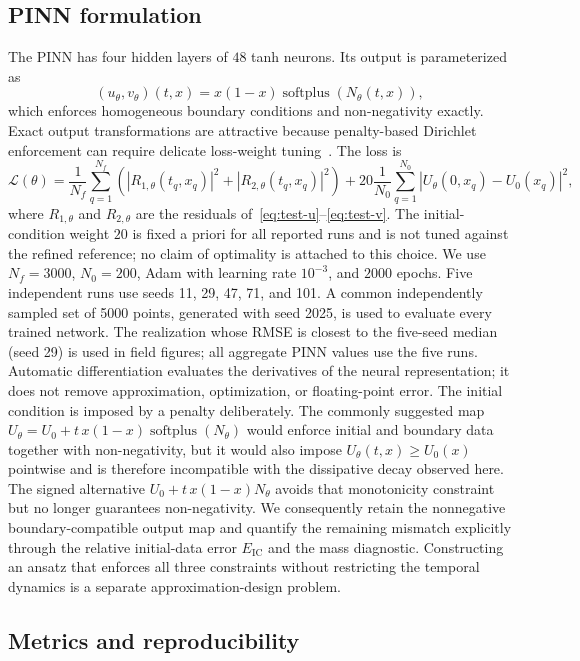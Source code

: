 \subsection{PINN formulation}

The PINN has four hidden layers of $48$ tanh neurons. Its output is parameterized as
\[
 (u_\theta,v_\theta)(t,x)=x(1-x)\operatorname{softplus}(N_\theta(t,x)),
\]
which enforces homogeneous boundary conditions and non-negativity exactly. Exact output transformations are attractive because penalty-based Dirichlet enforcement can require delicate loss-weight tuning~\cite{berrone2023dirichlet}. The loss is
\[
 \mathcal L(\theta)=\frac1{N_f}\sum_{q=1}^{N_f}
 \left(|R_{1,\theta}(t_q,x_q)|^2+|R_{2,\theta}(t_q,x_q)|^2\right)
 +20\frac1{N_0}\sum_{q=1}^{N_0}|U_\theta(0,x_q)-U_0(x_q)|^2,
\]
where $R_{1,\theta}$ and $R_{2,\theta}$ are the residuals of~\eqref{eq:test-u}--\eqref{eq:test-v}. The initial-condition weight $20$ is fixed a priori for all reported runs and is not tuned against the refined reference; no claim of optimality is attached to this choice. We use $N_f=3000$, $N_0=200$, Adam with learning rate $10^{-3}$, and $2000$ epochs. Five independent runs use seeds 11, 29, 47, 71, and 101. A common independently sampled set of 5000 points, generated with seed 2025, is used to evaluate every trained network. The realization whose RMSE is closest to the five-seed median (seed 29) is used in field figures; all aggregate PINN values use the five runs. Automatic differentiation evaluates the derivatives of the neural representation; it does not remove approximation, optimization, or floating-point error.
The initial condition is imposed by a penalty deliberately. The commonly suggested map $U_\theta=U_0+t\,x(1-x)\operatorname{softplus}(N_\theta)$ would enforce initial and boundary data together with non-negativity, but it would also impose $U_\theta(t,x)\ge U_0(x)$ pointwise and is therefore incompatible with the dissipative decay observed here. The signed alternative $U_0+t\,x(1-x)N_\theta$ avoids that monotonicity constraint but no longer guarantees non-negativity. We consequently retain the nonnegative boundary-compatible output map and quantify the remaining mismatch explicitly through the relative initial-data error $E_{\mathrm{IC}}$ and the mass diagnostic. Constructing an ansatz that enforces all three constraints without restricting the temporal dynamics is a separate approximation-design problem.

\subsection{Metrics and reproducibility}

